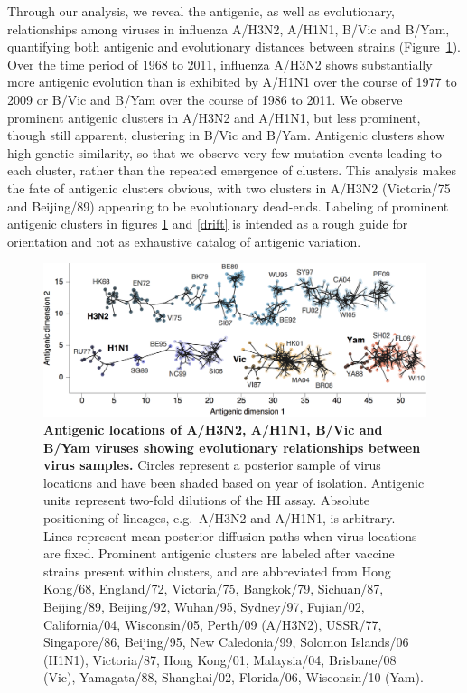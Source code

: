 \documentclass[11pt,oneside,letterpaper]{article}
\begin{document}
Through our analysis, we reveal the antigenic, as well as evolutionary, relationships among viruses in influenza A/H3N2, A/H1N1, B/Vic and B/Yam, quantifying both antigenic and evolutionary distances between strains (Figure~\ref{map}).
Over the time period of 1968 to 2011, influenza A/H3N2 shows substantially more antigenic evolution than is exhibited by A/H1N1 over the course of 1977 to 2009 or B/Vic and B/Yam over the course of 1986 to 2011.
We observe prominent antigenic clusters in A/H3N2 and A/H1N1, but less prominent, though still apparent, clustering in B/Vic and B/Yam.
Antigenic clusters show high genetic similarity, so that we observe very few mutation events leading to each cluster, rather than the repeated emergence of clusters.
This analysis makes the fate of antigenic clusters obvious, with two clusters in A/H3N2 (Victoria/75 and Beijing/89) appearing to be evolutionary dead-ends.
Labeling of prominent antigenic clusters in figures \ref{map} and \ref{drift} is intended as a rough guide for orientation and not as exhaustive catalog of antigenic variation.

\begin{figure}[h]
	\centering		
	\includegraphics[width=1.0\textwidth]{figures/map}
	\caption{\textbf{Antigenic locations of A/H3N2, A/H1N1, B/Vic and B/Yam viruses showing evolutionary relationships between virus samples.} 
	Circles represent a posterior sample of virus locations and have been shaded based on year of isolation.
	Antigenic units represent two-fold dilutions of the HI assay.
	Absolute positioning of lineages, e.g.\ A/H3N2 and A/H1N1, is arbitrary.
	Lines represent mean posterior diffusion paths when virus locations are fixed.
	Prominent antigenic clusters are labeled after vaccine strains present within clusters, and are abbreviated from Hong Kong/68, England/72, Victoria/75, Bangkok/79, Sichuan/87, Beijing/89, Beijing/92, Wuhan/95, Sydney/97, Fujian/02, California/04, Wisconsin/05, Perth/09 (A/H3N2), USSR/77, Singapore/86, Beijing/95, New Caledonia/99, Solomon Islands/06 (H1N1), Victoria/87, Hong Kong/01, Malaysia/04, Brisbane/08 (Vic), Yamagata/88, Shanghai/02, Florida/06, Wisconsin/10 (Yam).} 
	\label{map} 
\end{figure}
\end{document}

